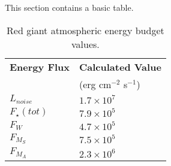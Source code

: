 This section contains a basic table.

\begin{table}
\begin{center}
\begin{tabular}{ll}
\hline
\textbf{Energy Flux}  & \textbf{Calculated Value}   \\
& (erg cm$^{-2}$ s$^{-1}$) \\
\hline
\hline 
$L_{noise}$ &  $1.7\times10^{7}$ \\   
$F_{\star}(tot)$ & $7.9\times10^{5}$ \\
$F_W$ & $4.7\times10^{5}$ \\
$F_{M_{S}}$ &  $7.5\times10^{5}$ \\
$F_{M_{A}}$ & $2.3\times10^{6}$ \\
\hline
\hline
\end{tabular}
\caption[Red Giant Atmospheric Energy Budget]
{Red giant atmospheric energy budget values.}
\label{tab:1}
\end{center}
\end{table}

